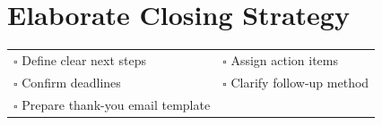 
\section{Elaborate Closing Strategy}
\label{sec:closing}

\begin{tabular}{p{9cm} p{8cm}}
$\square$ Define clear next steps & $\square$ Assign action items \\ 
$\square$ Confirm deadlines & $\square$ Clarify follow-up method \\ 
$\square$ Prepare thank-you email template & \\ 
\end{tabular}

